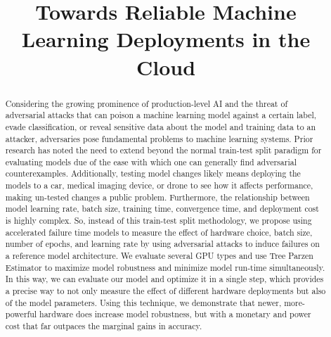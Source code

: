 \documentclass[conference]{IEEEtran}
\begin{document}
\title{Towards Reliable Machine Learning Deployments in the Cloud}
\author{
\and
{}
\and
{}
\and
{}
}

\maketitle

\begin{abstract}
Considering the growing prominence of production-level AI and the threat of adversarial attacks that can poison a machine learning model against a certain label, evade classification, or reveal sensitive data about the model and training data to an attacker, adversaries pose fundamental problems to machine learning systems. Prior research has noted the need to extend beyond the normal train-test split paradigm for evaluating models due of the ease with which one can generally find adversarial counterexamples. Additionally, testing model changes likely means deploying the models to a car, medical imaging device, or drone to see how it affects performance, making un-tested changes a public problem. Furthermore, the relationship between model learning rate, batch size, training time, convergence time, and deployment cost is highly complex. So, instead of this train-test split methodology, we propose using accelerated failure time models to measure the effect of hardware choice, batch size, number of epochs, and learning rate by using adversarial attacks to induce failures on a reference model architecture. We evaluate several GPU types and use Tree Parzen Estimator to maximize model robustness and minimize model run-time simultaneously. In this way, we can evaluate our model and optimize it in a single step, which provides a precise way to not only measure the effect of different hardware deployments but also of the model parameters. Using this technique, we demonstrate that newer, more-powerful hardware does increase model robustness, but with a monetary and power cost that far outpaces the marginal gains in accuracy.
\end{abstract}
\end{document}
